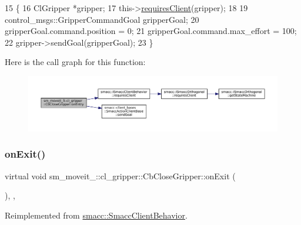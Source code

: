 \begin{DoxyCode}
15     \{
16         ClGripper *gripper;
17         this->\hyperlink{classsmacc_1_1ISmaccClientBehavior_a32b16e99e3b4cb289414203dc861a440}{requiresClient}(gripper);
18 
19         control\_msgs::GripperCommandGoal gripperGoal;
20         gripperGoal.command.position = 0;
21         gripperGoal.command.max\_effort = 100;
22         gripper->sendGoal(gripperGoal);
23     \}
\end{DoxyCode}
Here is the call graph for this function\+:
\nopagebreak
\begin{figure}[H]
\begin{center}
\leavevmode
\includegraphics[width=350pt]{classsm__moveit__3_1_1cl__gripper_1_1CbCloseGripper_afb060027abdf32de5c2d0e400c257228_cgraph}
\end{center}
\end{figure}
\mbox{\label{classsm__moveit__3_1_1cl__gripper_1_1CbCloseGripper_ad78af2da289e83bd9a7087bc31b14ecb}} 
\subsubsection{\texorpdfstring{on\+Exit()}{onExit()}}
{\footnotesize\ttfamily virtual void sm\+\_\+moveit\+\_\+::cl\+\_\+gripper\+::\+Cb\+Close\+Gripper\+::on\+Exit (\begin{DoxyParamCaption}{ }\end{DoxyParamCaption})\hspace{0.3cm}{\ttfamily [inline]}, {\ttfamily [override]}, {\ttfamily [virtual]}}



Reimplemented from \hyperlink{classsmacc_1_1SmaccClientBehavior_a7e4fb6ce81ff96dc172425852d69c0c5}{smacc\+::\+Smacc\+Client\+Behavior}.



